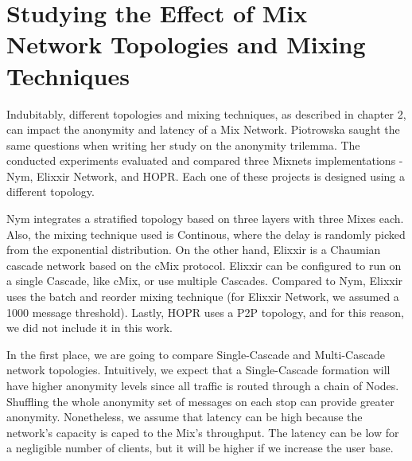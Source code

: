 \documentclass[logo,msc,cyber]{infthesis}   %
\begin{document}
\section{Studying the Effect of Mix Network Topologies and Mixing Techniques}

Indubitably, different topologies and mixing techniques, as described in chapter
2, can impact the anonymity and latency of a Mix Network. Piotrowska saught the
same questions when writing her study on the anonymity
trilemma\cite{piotrowska2021studying}. The conducted experiments evaluated and
compared three Mixnets implementations - Nym, Elixxir Network, and HOPR. Each
one of these projects is designed using a different topology. 

Nym integrates a stratified topology based on three layers with three Mixes
each. Also, the mixing technique used is Continous, where the delay is randomly
picked from the exponential distribution. On the other hand, Elixxir is a
Chaumian cascade network based on the cMix protocol\cite{chaum2017cmix}. Elixxir
can be configured to run on a single Cascade, like cMix, or use multiple
Cascades. Compared to Nym, Elixxir uses the batch and reorder mixing technique
(for Elixxir Network, we assumed a 1000 message threshold). Lastly, HOPR uses a
P2P topology, and for this reason, we did not include it in this work.


In the first place, we are going to compare Single-Cascade and Multi-Cascade
network topologies. Intuitively, we expect that a Single-Cascade formation will
have higher anonymity levels since all traffic is routed through a chain of
Nodes. Shuffling the whole anonymity set of messages on each stop can provide
greater anonymity. Nonetheless, we assume that latency can be high because the
network's capacity is caped to the Mix's throughput. The latency can be low for
a negligible number of clients, but it will be higher if we increase the user
base.
\end{document}
